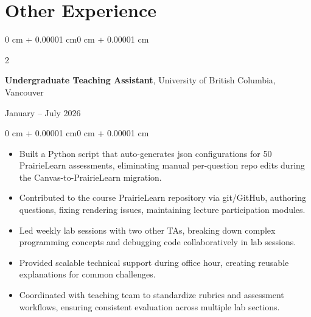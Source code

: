 \documentclass[10pt, letterpaper]{article}
\newenvironment{highlights}{
    \begin{itemize}[
        topsep=0.10 cm,
        parsep=0.10 cm,
        partopsep=0pt,
        itemsep=0pt,
        leftmargin=0 cm + 10pt
    ]
}{
    \end{itemize}
}
\newenvironment{onecolentry}{
    \begin{adjustwidth}{0 cm + 0.00001 cm}{0 cm + 0.00001 cm}
}{
    \end{adjustwidth}
}
\newenvironment{twocolentry}[2][]{
    \onecolentry
    \def\secondColumn{#2}
    \setcolumnwidth{\fill, 4.5 cm}
    \begin{paracol}{2}
}{
    \switchcolumn \raggedleft \secondColumn
    \end{paracol}
    \endonecolentry
}
\begin{document}
    \section{Other Experience}
    
    \begin{twocolentry}{January -- July 2026}
        \textbf{Undergraduate Teaching Assistant}, University of British Columbia, Vancouver
    \end{twocolentry}
    
    \vspace{0.10 cm}
    \begin{onecolentry}
        \begin{highlights}
            \item Built a Python script that auto-generates json configurations for 50 PrairieLearn assessments, eliminating manual per-question repo edits during the Canvas-to-PrairieLearn migration.
            \item Contributed to the course PrairieLearn repository via git/GitHub, authoring questions, fixing rendering issues, maintaining lecture participation modules.
            \item Led weekly lab sessions with two other TAs, breaking down complex programming concepts and debugging code collaboratively in lab sessions.
            \item Provided scalable technical support during office hour, creating reusable explanations for common challenges.
            \item Coordinated with teaching team to standardize rubrics and assessment workflows, ensuring consistent evaluation across multiple lab sections.
        \end{highlights}
    \end{onecolentry}
    
    
    
    
\end{document}
